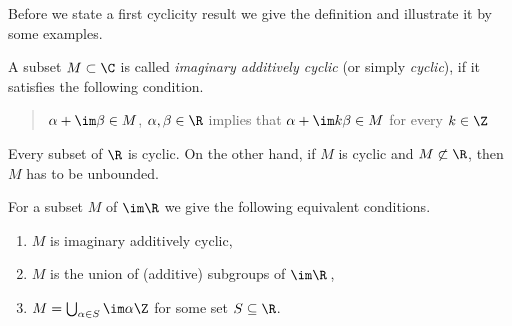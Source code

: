 Before we state a first cyclicity result we give the definition and illustrate it by some examples.
\begin{definition}\label{def:b3-2.5}

A subset $M \subset \C$ is called \emph{imaginary additively cyclic} 
(or simply \emph{cyclic}), if it satisfies the following condition. 
\begin{quote}
$\alpha + \im\beta \in M$, $\alpha,\beta \in \R$ implies that $\alpha +  \im k\beta \in M$ for every $k \in \Z$\,
\end{quote}
\end{definition}
Every subset of\/ $\R$ is cyclic. 
On the other hand, if\/ $M$ is cyclic and $M \not\subset \R$, then $M$ has to be unbounded.
	
For a subset $M$ of\/ $\im \R$ we give the following equivalent conditions.
	\begin{enumerate}[\upshape (a)]
		\item 
		$M$ is imaginary additively cyclic,
		
		\item 
		$M$ is the union of (additive) subgroups of\/ $\im \R$\,,
		
		\item 
		$M = \bigcup_{\alpha \in S} \im\alpha\Z$ for some set $S \subseteq \R$.
	\end{enumerate}
	
